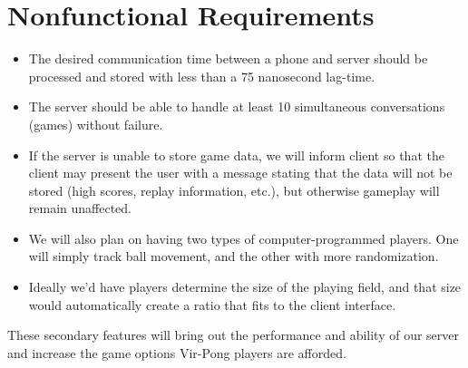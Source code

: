 \documentclass[letterpaper,12pt]{article}
\begin{document}
\section{Nonfunctional Requirements}
\begin{itemize}
\item The desired communication time between a phone and server should be processed and stored with less than a 75 nanosecond lag-time.
\item The server should be able to handle at least 10 simultaneous conversations (games) without failure. 
\item If the server is unable to store game data, we will inform client so that the client may present the user with a message stating that the data will not be stored (high scores, replay information, etc.), but otherwise gameplay will remain unaffected. 
\item We will also plan on having two types of computer-programmed players. One will simply track ball movement, and the other with more randomization. 
\item Ideally we'd have players determine the size of the playing field, and that size would automatically create a ratio that fits to the client interface. 
\end{itemize}
These secondary features will bring out the performance and ability of our server and increase the game options Vir-Pong players are afforded. 
\end{document}
